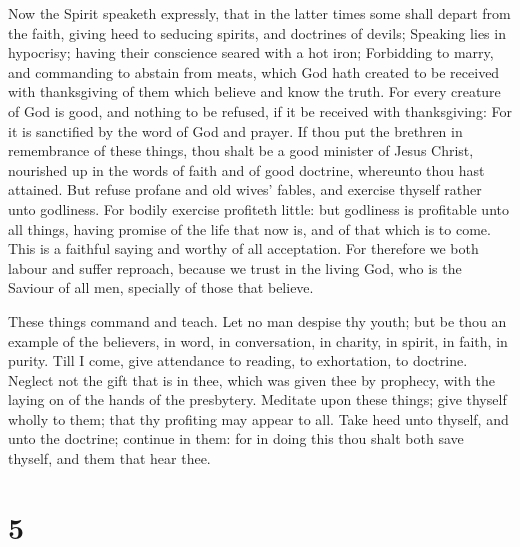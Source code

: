  Now the Spirit speaketh expressly, that in the latter times
some shall depart from the faith, giving heed to seducing spirits, and
doctrines of devils;  Speaking lies in hypocrisy; having
their conscience seared with a hot iron;  Forbidding to
marry, and commanding to abstain from meats, which God hath created to
be received with thanksgiving of them which believe and know the truth.
 For every creature of God is good, and nothing to be
refused, if it be received with thanksgiving:  For it is
sanctified by the word of God and prayer.  If thou put the
brethren in remembrance of these things, thou shalt be a good minister
of Jesus Christ, nourished up in the words of faith and of good
doctrine, whereunto thou hast attained.  But refuse profane
and old wives' fables, and exercise thyself rather unto godliness.
 For bodily exercise profiteth little: but godliness is
profitable unto all things, having promise of the life that now is, and
of that which is to come.  This is a faithful saying and
worthy of all acceptation.  For therefore we both labour
and suffer reproach, because we trust in the living God, who is the
Saviour of all men, specially of those that believe.

 These things command and teach.  Let no man
despise thy youth; but be thou an example of the believers, in word, in
conversation, in charity, in spirit, in faith, in purity. 
Till I come, give attendance to reading, to exhortation, to doctrine.
 Neglect not the gift that is in thee, which was given thee
by prophecy, with the laying on of the hands of the presbytery.
 Meditate upon these things; give thyself wholly to them;
that thy profiting may appear to all.  Take heed unto
thyself, and unto the doctrine; continue in them: for in doing this thou
shalt both save thyself, and them that hear thee.

\hypertarget{section-4}{%
\section{5}\label{section-4}}

